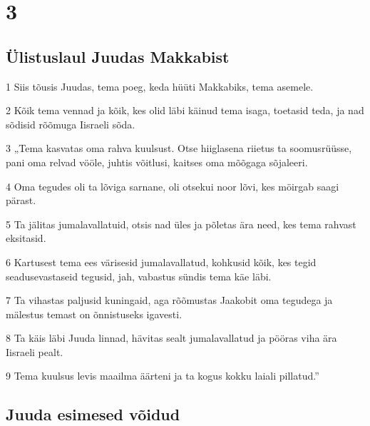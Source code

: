 \chapter{3}

\section*{Ülistuslaul Juudas Makkabist}

\par 1 Siis tõusis Juudas, tema poeg, keda hüüti Makkabiks, tema asemele.
\par 2 Kõik tema vennad ja kõik, kes olid läbi käinud tema isaga, toetasid teda, ja nad sõdisid rõõmuga Iisraeli sõda. 
\par 3 „Tema kasvatas oma rahva kuulsust. Otse hiiglasena riietus ta soomusrüüsse, pani oma relvad vööle, juhtis võitlusi, kaitses oma mõõgaga sõjaleeri.
\par 4 Oma tegudes oli ta lõviga sarnane, oli otsekui noor lõvi, kes möirgab saagi pärast.
\par 5 Ta jälitas jumalavallatuid, otsis nad üles ja põletas ära need, kes tema rahvast eksitasid.
\par 6 Kartusest tema ees värisesid jumalavallatud, kohkusid kõik, kes tegid seadusevastaseid tegusid, jah, vabastus sündis tema käe läbi.
\par 7 Ta vihastas paljusid kuningaid, aga rõõmustas Jaakobit oma tegudega ja mälestus temast on õnnistuseks igavesti.
\par 8 Ta käis läbi Juuda linnad, hävitas sealt jumalavallatud ja pööras viha ära Iisraeli pealt.
\par 9 Tema kuulsus levis maailma äärteni ja ta kogus kokku laiali pillatud.” 

\section*{Juuda esimesed võidud}

